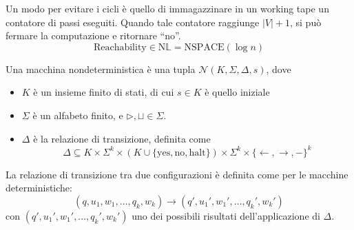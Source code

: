 Un modo per evitare i cicli è quello di immagazzinare in un working tape un contatore di passi eseguiti. Quando tale contatore raggiunge $|V|+1$, si può fermare la computazione e ritornare ``no''. 
$$
    \text{Reachability} \in \text{N}\mathbb{L} = \text{NSPACE}(\log n)
$$

\begin{definition}
    Una macchina nondeterministica è una tupla $\mathcal{N}(K,\Sigma,\Delta,s)$, dove
    \begin{itemize}
        \item $K$ è un insieme finito di stati, di cui $s\in K$ è quello iniziale
        \item $\Sigma$ è un alfabeto finito, e $\rhd,\sqcup\in\Sigma$.
        \item $\Delta$ è la relazione di transizione, definita come 
        $$
        \Delta\subseteq K\times\Sigma^k\times (K\cup\{\text{yes},\text{no},\text{halt}\}) \times \Sigma^k \times \{\gets,\to,-\}^k
        $$
    \end{itemize}
    La relazione di transizione tra due configurazioni è definita come per le macchine deterministiche:
    $$
        (q,u_1,w_1,\dots,q_k,w_k) \to (q',u_1',w_1',\dots,q_k',w_k')
    $$
    con $(q',u_1',w_1',\dots,q_k',w_k')$ uno dei possibili risultati dell'applicazione di $\Delta$.
\end{definition}

